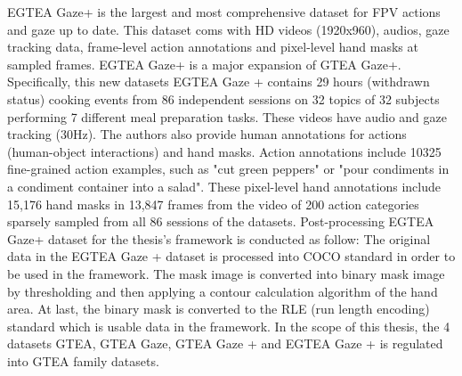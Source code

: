 EGTEA Gaze+ \cite{li2020eye} is the largest and most comprehensive dataset for FPV actions and gaze up to date. This dataset coms with HD videos (1920x960), audios, gaze tracking data, frame-level action annotations and pixel-level hand masks at sampled frames. EGTEA Gaze+ is a major expansion of GTEA Gaze+. Specifically, this new datasets EGTEA Gaze + contains 29 hours (withdrawn status) cooking events from 86 independent sessions on 32 topics of 32 subjects performing 7 different meal preparation tasks. These videos have audio and gaze tracking (30Hz). The authors also provide human annotations for actions (human-object interactions) and hand masks. Action annotations include 10325 fine-grained action examples, such as "cut green peppers" or "pour condiments in a condiment container into a salad". These pixel-level hand annotations include 15,176 hand masks in 13,847 frames from the video of 200 action categories sparsely sampled from all 86 sessions of the datasets. Post-processing EGTEA Gaze+ dataset for the thesis’s framework is conducted as follow: The original data in the EGTEA Gaze + dataset is processed into COCO standard in order to be used in the framework. The mask image is converted into binary mask image by thresholding and then applying a contour calculation algorithm of the hand area. At last, the binary mask is converted to the RLE (run length encoding) standard which is usable data in the framework. In the scope of this thesis, the 4 datasets GTEA, GTEA Gaze, GTEA Gaze + and EGTEA Gaze + is regulated into GTEA family datasets.

